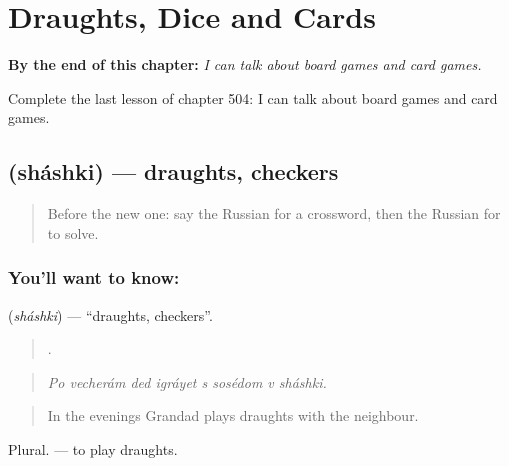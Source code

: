 
\chapter{Draughts, Dice and Cards}
\label{ch:ru-draughts-dice-and-cards}

\begin{chapteropening}
\textbf{By the end of this chapter:} \emph{I can talk about board games and card games.}

Complete the last lesson of chapter 504: I can talk about board games and card games.
\end{chapteropening}

\section[\texorpdfstring{\ru{шашки} (sháshki)}{шашки (sháshki)}]{ (sháshki) — draughts, checkers}

\label{lesson:RU-C504-shashki}



\begin{quote}
Before the new one: say the Russian for a crossword, then the Russian for to solve.
\end{quote}

\subsection*{You'll want to know: }
\textbf{} (\emph{sháshki}) — \textquotedblleft{}draughts, checkers\textquotedblright{}.

\begin{quote}
       .
\end{quote}

\begin{quote}
\emph{Po vecherám ded igráyet s sosédom v sháshki.}
\end{quote}

\begin{quote}
In the evenings Grandad plays draughts with the neighbour.
\end{quote}

Plural. \emph{  } — to play draughts.

